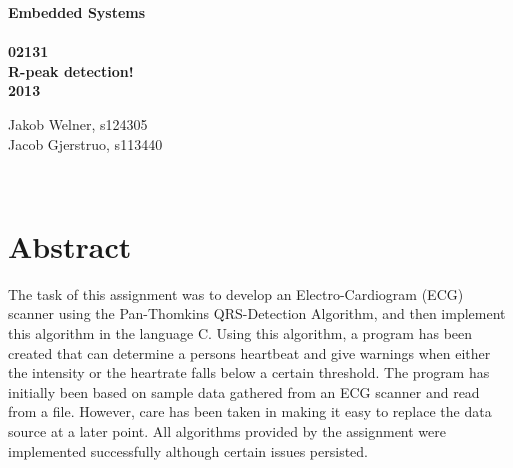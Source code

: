 \documentclass[12pt,a4paper]{article}
\begin{document}
\begin{titlepage}
	\begin{center}
		\vspace*{13\baselineskip}
		\huge
		\bfseries
		Embedded Systems\\ 
		\ \\
		02131 \\[5\baselineskip]

		\normalfont
		\Large
		R-peak detection!\\	
		2013

		\small
		\vfill
	\end{center}	
	\begin{flushleft}
		Jakob Welner, s124305\\
	 	Jacob Gjerstruo, s113440\\
	\end{flushleft}
\end{titlepage}

\ \\
\section*{Abstract}
The task of this assignment was to develop an Electro-Cardiogram (ECG) scanner using the Pan-Thomkins QRS-Detection Algorithm, and then implement this algorithm in the language C. Using this algorithm, a program has been created that can determine a persons heartbeat and give warnings when either the intensity or the heartrate falls below a certain threshold. The program has initially been based on sample data gathered from an ECG scanner and read from a file. However, care has been taken in making it easy to replace the data source at a later point. 
All algorithms provided by the assignment were implemented successfully although certain issues persisted.

\thispagestyle{empty} 
\newpage

\tableofcontents
\thispagestyle{empty} 
\newpage

\setcounter{page}{1}

\ \\
\end{document}
